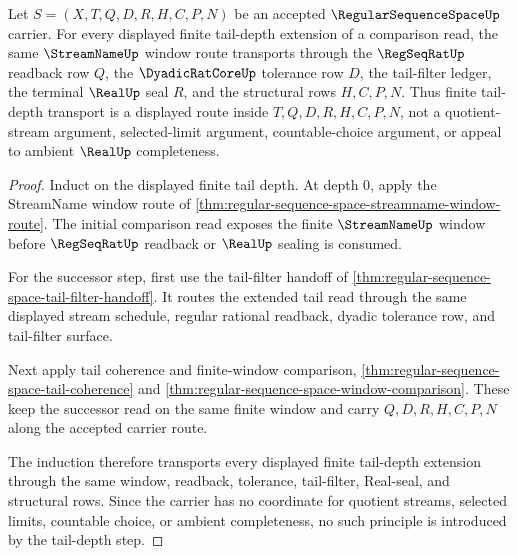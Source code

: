 \begin{theorem}
\label{thm:regular-sequence-space-tail-window-transport}
Let $S=(X,T,Q,D,R,H,C,P,N)$ be an accepted $\RegularSequenceSpaceUp$ carrier. For every displayed finite tail-depth extension of a comparison read, the same $\StreamNameUp$ window route transports through the $\RegSeqRatUp$ readback row $Q$, the $\DyadicRatCoreUp$ tolerance row $D$, the tail-filter ledger, the terminal $\RealUp$ seal $R$, and the structural rows $H,C,P,N$. Thus finite tail-depth transport is a displayed route inside $T,Q,D,R,H,C,P,N$, not a quotient-stream argument, selected-limit argument, countable-choice argument, or appeal to ambient $\RealUp$ completeness.
\end{theorem}
\begin{proof}
Induct on the displayed finite tail depth. At depth $0$, apply the StreamName window route of \autoref{thm:regular-sequence-space-streamname-window-route}. The initial comparison read exposes the finite $\StreamNameUp$ window before $\RegSeqRatUp$ readback or $\RealUp$ sealing is consumed.

For the successor step, first use the tail-filter handoff of \autoref{thm:regular-sequence-space-tail-filter-handoff}. It routes the extended tail read through the same displayed stream schedule, regular rational readback, dyadic tolerance row, and tail-filter surface.

Next apply tail coherence and finite-window comparison, \autoref{thm:regular-sequence-space-tail-coherence} and \autoref{thm:regular-sequence-space-window-comparison}. These keep the successor read on the same finite window and carry $Q,D,R,H,C,P,N$ along the accepted carrier route.

The induction therefore transports every displayed finite tail-depth extension through the same window, readback, tolerance, tail-filter, Real-seal, and structural rows. Since the carrier has no coordinate for quotient streams, selected limits, countable choice, or ambient completeness, no such principle is introduced by the tail-depth step.
\end{proof}

